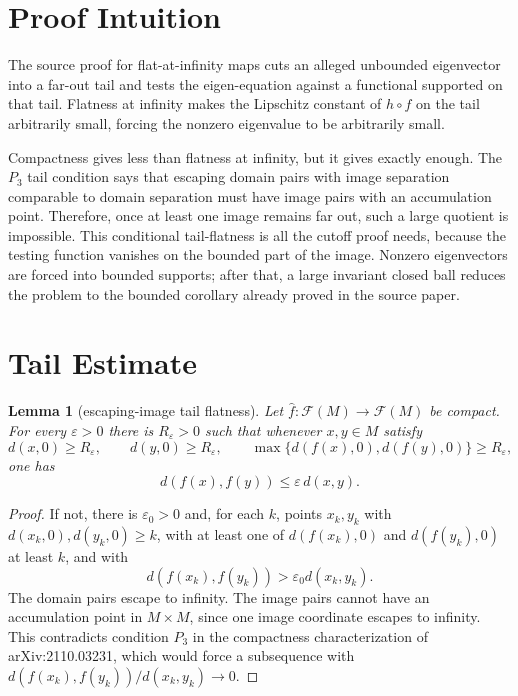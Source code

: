 \documentclass[11pt]{article}
\newtheorem{lemma}{Lemma}
\newcommand{\F}{\mathcal F}
\newcommand{\eps}{\varepsilon}
\begin{document}
\section*{Proof Intuition}

The source proof for flat-at-infinity maps cuts an alleged unbounded
eigenvector into a far-out tail and tests the eigen-equation against a
functional supported on that tail.  Flatness at infinity makes the Lipschitz
constant of \(h\circ f\) on the tail arbitrarily small, forcing the nonzero
eigenvalue to be arbitrarily small.

Compactness gives less than flatness at infinity, but it gives exactly enough.
The \(P_3\) tail condition says that escaping domain pairs with image
separation comparable to domain separation must have image pairs with an
accumulation point.  Therefore, once at least one image remains far out, such a
large quotient is impossible.  This conditional tail-flatness is all the
cutoff proof needs, because the testing function vanishes on the bounded part
of the image.  Nonzero eigenvectors are forced into bounded supports; after
that, a large invariant closed ball reduces the problem to the bounded
corollary already proved in the source paper.

\section*{Tail Estimate}

\begin{lemma}[escaping-image tail flatness]\label{lem:tail}
Let \(\widehat f:\F(M)\to\F(M)\) be compact.  For every \(\eps>0\) there is
\(R_\eps>0\) such that whenever \(x,y\in M\) satisfy
\[
d(x,0)\ge R_\eps,\qquad d(y,0)\ge R_\eps,\qquad
\max\{d(f(x),0),d(f(y),0)\}\ge R_\eps,
\]
one has
\[
d(f(x),f(y))\le \eps\, d(x,y).
\]
\end{lemma}

\begin{proof}
If not, there is \(\eps_0>0\) and, for each \(k\), points \(x_k,y_k\) with
\(d(x_k,0),d(y_k,0)\ge k\), with at least one of \(d(f(x_k),0)\) and
\(d(f(y_k),0)\) at least \(k\), and with
\[
d(f(x_k),f(y_k))>\eps_0 d(x_k,y_k).
\]
The domain pairs escape to infinity.  The image pairs cannot have an
accumulation point in \(M\times M\), since one image coordinate escapes to
infinity.  This contradicts condition \(P_3\) in the compactness
characterization of arXiv:2110.03231, which would force a subsequence with
\(d(f(x_k),f(y_k))/d(x_k,y_k)\to0\).
\end{proof}
\end{document}
